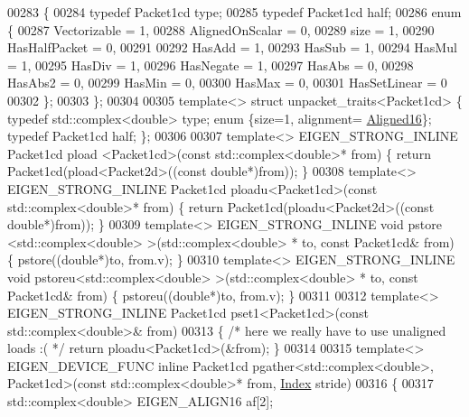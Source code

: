 \begin{DoxyCode}
00283 \{
00284   \textcolor{keyword}{typedef} Packet1cd type;
00285   \textcolor{keyword}{typedef} Packet1cd half;
00286   \textcolor{keyword}{enum} \{
00287     Vectorizable = 1,
00288     AlignedOnScalar = 0,
00289     size = 1,
00290     HasHalfPacket = 0,
00291 
00292     HasAdd    = 1,
00293     HasSub    = 1,
00294     HasMul    = 1,
00295     HasDiv    = 1,
00296     HasNegate = 1,
00297     HasAbs    = 0,
00298     HasAbs2   = 0,
00299     HasMin    = 0,
00300     HasMax    = 0,
00301     HasSetLinear = 0
00302   \};
00303 \};
00304 
00305 \textcolor{keyword}{template}<> \textcolor{keyword}{struct }unpacket\_traits<Packet1cd> \{ \textcolor{keyword}{typedef} std::complex<double> type; \textcolor{keyword}{enum} \{size=1, alignment=
      \hyperlink{group__enums_gga45fe06e29902b7a2773de05ba27b47a1af8e2bf74b04c02199f62c5e3c06dbfcc}{Aligned16}\}; \textcolor{keyword}{typedef} Packet1cd half; \};
00306 
00307 \textcolor{keyword}{template}<> EIGEN\_STRONG\_INLINE Packet1cd pload <Packet1cd>(\textcolor{keyword}{const} std::complex<double>* from) \{ \textcolor{keywordflow}{return} 
      Packet1cd(pload<Packet2d>((\textcolor{keyword}{const} \textcolor{keywordtype}{double}*)from)); \}
00308 \textcolor{keyword}{template}<> EIGEN\_STRONG\_INLINE Packet1cd ploadu<Packet1cd>(\textcolor{keyword}{const} std::complex<double>* from) \{ \textcolor{keywordflow}{return} 
      Packet1cd(ploadu<Packet2d>((\textcolor{keyword}{const} \textcolor{keywordtype}{double}*)from)); \}
00309 \textcolor{keyword}{template}<> EIGEN\_STRONG\_INLINE \textcolor{keywordtype}{void} pstore <std::complex<double> >(std::complex<double> *   to, \textcolor{keyword}{const} 
      Packet1cd& from) \{ pstore((\textcolor{keywordtype}{double}*)to, from.v); \}
00310 \textcolor{keyword}{template}<> EIGEN\_STRONG\_INLINE \textcolor{keywordtype}{void} pstoreu<std::complex<double> >(std::complex<double> *   to, \textcolor{keyword}{const} 
      Packet1cd& from) \{ pstoreu((\textcolor{keywordtype}{double}*)to, from.v); \}
00311 
00312 \textcolor{keyword}{template}<> EIGEN\_STRONG\_INLINE Packet1cd pset1<Packet1cd>(\textcolor{keyword}{const} std::complex<double>&  from)
00313 \{ \textcolor{comment}{/* here we really have to use unaligned loads :( */} \textcolor{keywordflow}{return} ploadu<Packet1cd>(&from); \}
00314 
00315 \textcolor{keyword}{template}<> EIGEN\_DEVICE\_FUNC \textcolor{keyword}{inline} Packet1cd pgather<std::complex<double>, Packet1cd>(\textcolor{keyword}{const} 
      std::complex<double>* from, \hyperlink{namespace_eigen_a62e77e0933482dafde8fe197d9a2cfde}{Index} stride)
00316 \{
00317   std::complex<double> EIGEN\_ALIGN16 af[2];

\end{DoxyCode}
